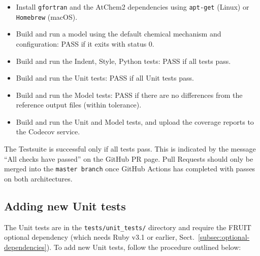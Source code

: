 \begin{itemize}
\item Install \texttt{gfortran} and the AtChem2 dependencies using \texttt{apt-get} (Linux) or
  \texttt{Homebrew} (macOS).
\item Build and run a model using the default chemical mechanism and configuration: PASS if it
  exits with status 0.
\item Build and run the Indent, Style, Python tests: PASS if all tests pass.
\item Build and run the Unit tests: PASS if all Unit tests pass.
\item Build and run the Model tests: PASS if there are no differences from the reference output
  files (within tolerance).
\item Build and run the Unit and Model tests, and upload the coverage reports to the Codecov
  service.
\end{itemize}

The Testsuite is successful only if all tests pass. This is indicated by the message ``All
checks have passed'' on the GitHub PR page. Pull Requests should only be merged into the
\texttt{master\ branch} once GitHub Actions has completed with passes on both architectures.

\subsection{Adding new Unit tests} \label{subsec:adding-new-unit-tests}

The Unit tests are in the \texttt{tests/unit\_tests/} directory and require the FRUIT optional
dependency (which needs Ruby v3.1 or earlier, Sect.~\ref{subsec:optional-dependencies}). To add
new Unit tests, follow the procedure outlined below:

